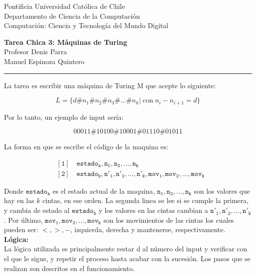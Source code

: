 \documentclass[12pt]{article}
\begin{document}
\begin{flushleft}
{\footnotesize Pontificia Universidad Católica de Chile\\
Departamento de Ciencia de la Computación\\
Computación: Ciencia y Tecnología del Mundo Digital\\
}
\begin{center}
{\huge\bf Tarea Chica 3: Máquinas de Turing}\\ \vspace{0.5cm}
Profesor Denis Parra \\
Manuel Espinoza Quintero \\

\rule{\linewidth}{0.1mm}
\end{center}
\end{flushleft}

La tarea es escribir una máquina de Turing M que acepte lo siguiente:

$$L=\{d\# n_1\# n_2 \# n_3 \#...\# n_k | \; \textrm{con} \; n_i-n_{i+1}=d\}$$

Por lo tanto, un ejemplo de input sería:

$$00011\#10100\#10001\#01110\#01011$$

La forma en que se escribe el código de la maquina es:

\begin{equation*}
    \begin{split}
        & \mathtt{{\scriptstyle [1]} \quad estado_a, n_1, n_2, ..., n_k}\\
        & \mathtt{{\scriptstyle [2]} \quad estado_b, n'_1, n'_2, ..., n'_k, mov_1, mov_2, ..., mov_k}
    \end{split}
\end{equation*}

Donde $\mathtt{estado_a}$ es el estado actual de la maquina, $\mathtt{n_1, n_2, ...,n_k}$ son los valores que hay en las $k$ cintas, en ese orden. La segunda linea se lee si se cumple la primera, y cambia de estado al $\mathtt{estado_b}$ y los valores en las cintas cambian a $\mathtt{n'_1, n'_2, ...,n'_k}$. Por último, $\mathtt{mov_1, mov_2, ..., mov_k}$ son los movimientos de las cintas los cuales pueden ser: $\mathtt{<, >, -}$, izquierda, derecha y mantenerse, respectivamente.\\

\textbf{Lógica:}\\
La lógica utilizada es principalmente restar d al número del input y verificar con el que le sigue, y repetir el proceso hasta acabar con la sucesión. Los pasos que se realizan son descritos en el funcionamiento.
\end{document}
